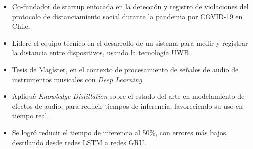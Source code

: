 \documentclass[10pt,a4paper]{altacv}
\begin{document}
\divider

\begin{itemize}
\item Co-fundador de startup enfocada en la detección y registro de violaciones del protocolo de distanciamiento social durante la pandemia por COVID-19 en Chile.
\item Lideré el equipo técnico en el desarrollo de un sistema para medir y registrar la distancia entre dispositivos, usando la tecnología UWB.

\end{itemize}

\divider


{}

\vspace{3pt}

\begin{itemize}
\item Tesis de Magíster, en el contexto de procesamiento de señales de audio de instrumentos musicales con \textit{Deep Learning}.
\item Apliqué \textit{Knowledge Distillation} sobre el estado del arte en modelamiento de efectos de audio, para reducir tiempos de inferencia, favoreciendo su uso en tiempo real. 
\item Se logró reducir el tiempo de inferencia al 50\%, con errores más bajos, destilando desde redes LSTM a redes GRU.
\end{itemize}

\divider
\end{document}
